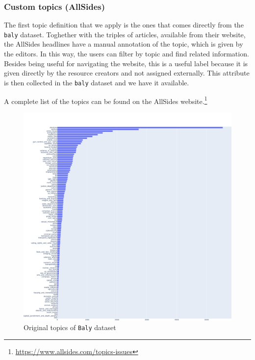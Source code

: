 
\subsubsection{\statusgreen Custom topics (AllSides)}

The first topic definition that we apply is the ones that comes directly from the \texttt{baly} dataset. Toghether with the triples of articles, available from their website, the AllSides headlines have a manual annotation of the topic, which is given by the editors. In this way, the users can filter by topic and find related information.
Besides being useful for navigating the website, this is a useful label because it is given directly by the resource creators and not assigned externally.
This attribute is then collected in the \texttt{baly} dataset and we have it available.

A complete list of the topics can be found on the AllSides website.\footnote{\url{https://www.allsides.com/topics-issues}}

\begin{figure}[!htbp]
    \centering
    \includegraphics[width=\linewidth]{figures/baly_original_topics.pdf}
    \caption{Original topics of \texttt{Baly} dataset}
    \label{fig:baly_original_topics}
\end{figure}

